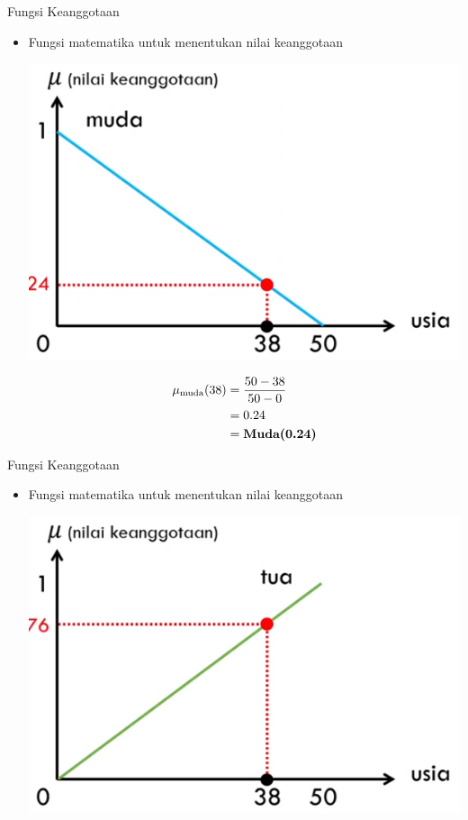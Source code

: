 \documentclass[pdflatex,compress,mathserif]{beamer}
\begin{document}
\begin{frame}{Fungsi Keanggotaan}
	\begin{itemize}
		\item Fungsi matematika untuk menentukan nilai keanggotaan
		\begin{multicols}{2}
			\begin{center}
				\includegraphics[width=\linewidth]{img/08}
			\end{center}
			\columnbreak
			\begin{align*}
				\mu_{\text{muda}}(38) &= \frac{50 - 38}{50 - 0} \\
				&= 0.24 \\
				&= \text{\textbf{Muda(0.24)}}
			\end{align*}
		\end{multicols}
	\end{itemize}
\end{frame}

\begin{frame}{Fungsi Keanggotaan}
	\begin{itemize}
		\item Fungsi matematika untuk menentukan nilai keanggotaan
		\begin{center}
			\includegraphics[width=0.5\linewidth]{img/09}
		\end{center}
	\end{itemize}
\end{frame}
\end{document}
